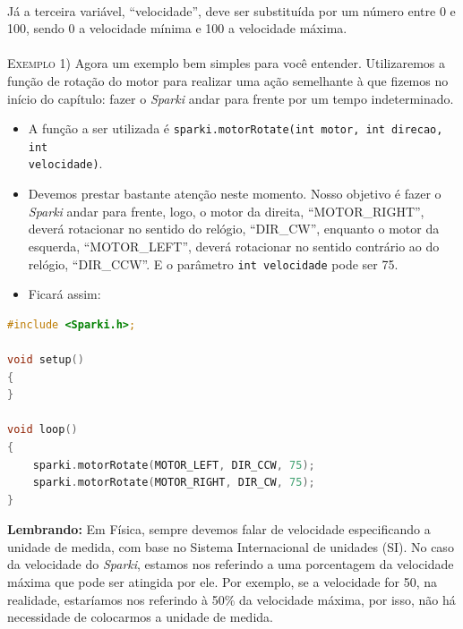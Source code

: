 \paragraph{}
Já a terceira variável, ``velocidade'', deve ser substituída por um número entre 0 e 100, sendo 0 a velocidade mínima e 100 a velocidade máxima.
\\~\\
\textsc{Exemplo 1)} Agora um exemplo bem simples para você entender. Utilizaremos a função de rotação do motor para realizar uma ação semelhante à que fizemos no início do capítulo: fazer o \textsl{Sparki} andar para frente por um tempo indeterminado.
        
\begin{itemize}
    \item A função a ser utilizada é \lstinline[columns=fixed]{sparki.motorRotate(int motor, int direcao, int } \\ \lstinline[columns=fixed]{velocidade)}.
    \item Devemos prestar bastante atenção neste momento. Nosso objetivo é fazer o \textsl{Sparki} andar para frente, logo, o motor da direita, ``MOTOR\_RIGHT'', deverá rotacionar no sentido do relógio, ``DIR\_CW'', enquanto o motor da esquerda, ``MOTOR\_LEFT'', deverá rotacionar no sentido contrário ao do relógio, ``DIR\_CCW''. E o parâmetro \lstinline[columns=fixed]{int velocidade} pode ser 75.
    \item Ficará assim:
\end{itemize}
    
    \begin{lstlisting}[language=C]
#include <Sparki.h>;

void setup()
{
}

void loop()
{
    sparki.motorRotate(MOTOR_LEFT, DIR_CCW, 75);
    sparki.motorRotate(MOTOR_RIGHT, DIR_CW, 75);
}
\end{lstlisting}

\begin{center}
    \textcolor{mydarkblue!80!black}{\textbf{Lembrando:}} Em Física, sempre devemos falar de velocidade especificando a unidade de medida, com base no Sistema Internacional de unidades (SI). No caso da velocidade do \textsl{Sparki}, estamos nos referindo a uma porcentagem da velocidade máxima que pode ser atingida por ele. Por exemplo, se a velocidade for 50, na realidade, estaríamos nos referindo à 50\% da velocidade máxima, por isso, não há necessidade de colocarmos a unidade de medida.
\end{center}

